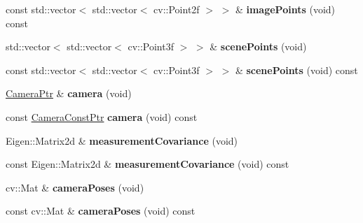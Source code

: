 \begin{DoxyCompactItemize}
const std\+::vector$<$ std\+::vector$<$ cv\+::\+Point2f $>$ $>$ \& {\bfseries image\+Points} (void) const
\item 
\mbox{\label{classcamodocal_1_1CameraCalibration_a6f850b6c713b5a822a0b6e4310017a0c}} 
std\+::vector$<$ std\+::vector$<$ cv\+::\+Point3f $>$ $>$ \& {\bfseries scene\+Points} (void)
\item 
\mbox{\label{classcamodocal_1_1CameraCalibration_a34f423299c758173cf2fd2ec5080fd42}} 
const std\+::vector$<$ std\+::vector$<$ cv\+::\+Point3f $>$ $>$ \& {\bfseries scene\+Points} (void) const
\item 
\mbox{\label{classcamodocal_1_1CameraCalibration_a36314a8ff7d13853ec2fa572f6230588}} 
\hyperlink{Camera_8h_a9f66c7d396fa23ffb2a4512670a78b84}{Camera\+Ptr} \& {\bfseries camera} (void)
\item 
\mbox{\label{classcamodocal_1_1CameraCalibration_ad0851d9b65acfe775d75d5973b5f754a}} 
const \hyperlink{Camera_8h_a03fe5d6885a007cb4ad26d11f6198586}{Camera\+Const\+Ptr} {\bfseries camera} (void) const
\item 
\mbox{\label{classcamodocal_1_1CameraCalibration_a45df9fe3fa2cf4ab9d3002eb0636bb72}} 
Eigen\+::\+Matrix2d \& {\bfseries measurement\+Covariance} (void)
\item 
\mbox{\label{classcamodocal_1_1CameraCalibration_a8fe3e53a6ad83a0c28d196ae6114014c}} 
const Eigen\+::\+Matrix2d \& {\bfseries measurement\+Covariance} (void) const
\item 
\mbox{\label{classcamodocal_1_1CameraCalibration_afaa75cf84619b2660e0e2adb1ec7f7d0}} 
cv\+::\+Mat \& {\bfseries camera\+Poses} (void)
\item 
\mbox{\label{classcamodocal_1_1CameraCalibration_a5406b15c8ce833a38c960cb54b405c1c}} 
const cv\+::\+Mat \& {\bfseries camera\+Poses} (void) const
\item 
\mbox{\label{classcamodocal_1_1CameraCalibration_af6da01f9e5aab14beabbbec5bb3c4e69}} 

\end{DoxyCompactItemize}
